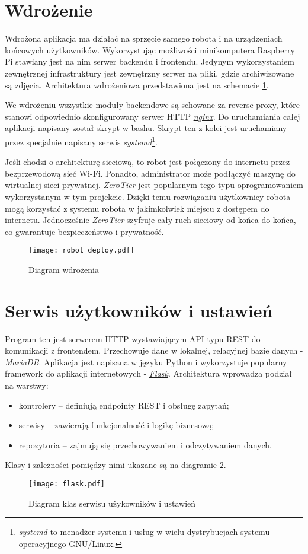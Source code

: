 \section{Wdrożenie}
Wdrożona aplikacja ma działać na sprzęcie samego robota i na urządzeniach końcowych użytkowników.
Wykorzystując możliwości minikomputera Raspberry Pi stawiany jest na nim serwer backendu i frontendu.
Jedynym wykorzystaniem zewnętrznej infrastruktury jest zewnętrzny serwer na pliki, gdzie archiwizowane są zdjęcia.
Architektura wdrożeniowa przedstawiona jest na schemacie \ref{rys:deploy}.

We wdrożeniu wszystkie moduły backendowe są schowane za reverse proxy, które stanowi odpowiednio skonfigurowany serwer HTTP \href{https://nginx.org/}{\textit{nginx}}.
Do uruchamiania całej aplikacji napisany został skrypt w bashu.
Skrypt ten z kolei jest uruchamiany przez specjalnie napisany serwis \textit{systemd}\footnote{\textit{systemd} to menadżer systemu i usług w wielu dystrybucjach systemu operacyjnego GNU/Linux.}.

Jeśli chodzi o architekturę sieciową, to robot jest połączony do internetu przez bezprzewodową sieć Wi-Fi.
Ponadto, administrator może podłączyć maszynę do wirtualnej sieci prywatnej.
\href{https://www.zerotier.com/}{\textit{ZeroTier}} jest popularnym tego typu oprogramowaniem wykorzystanym w tym projekcie.
Dzięki temu rozwiązaniu użytkownicy robota mogą korzystać z systemu robota w jakimkolwiek miejscu z dostępem do internetu.
Jednocześnie \textit{ZeroTier} szyfruje cały ruch sieciowy od końca do końca, co gwarantuje bezpieczeństwo i prywatność.
\begin{figure}[H]
    \centering \texttt{[image: robot\_deploy.pdf]}
    \caption{Diagram wdrożenia}
    \label{rys:deploy}
\end{figure}

\section{Serwis użytkowników i ustawień}
\label{main_backend}
Program ten jest serwerem HTTP wystawiającym API typu REST do komunikacji z frontendem.
Przechowuje dane w lokalnej, relacyjnej bazie danych - \textit{MariaDB}.
Aplikacja jest napisana w języku Python i wykorzystuje popularny framework do aplikacji internetowych - \href{https://flask.palletsprojects.com/en/stable/}{\textit{Flask}}.
Architektura wprowadza podział na warstwy:
\begin{itemize}
    \item kontrolery -- definiują endpointy REST i obsługę zapytań;
    \item serwisy -- zawierają funkcjonalność i logikę biznesową;
    \item repozytoria -- zajmują się przechowywaniem i odczytywaniem danych.
\end{itemize}
Klasy i zależności pomiędzy nimi ukazane są na diagramie \ref{rys:flask}.
\begin{figure}[H]
    \centering \texttt{[image: flask.pdf]}
    \caption{Diagram klas serwisu użykowników i ustawień}
    \label{rys:flask}
\end{figure}

